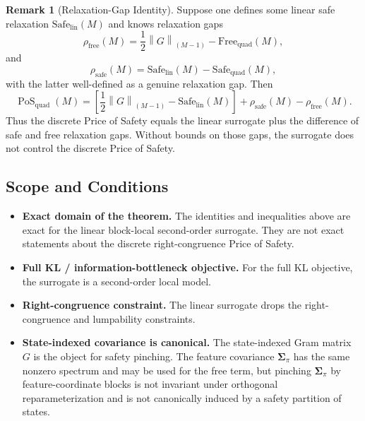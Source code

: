 \documentclass[12pt]{article}
\theoremstyle{definition}
\newtheorem{remark}[theorem]{Remark}
\DeclareMathOperator{\PoS}{PoS}
\newcommand{\KyF}[2]{\left\|#1\right\|_{(#2)}}
\newcommand{\PoSquad}{\PoS_{\mathrm{quad}}}
\begin{document}
\begin{remark}[Relaxation-Gap Identity]
\label{rem:relaxation-gap}
Suppose one defines some linear safe relaxation
$\mathrm{Safe}_{\mathrm{lin}}(M)$ and knows relaxation gaps
\[
\rho_{\mathrm{free}}(M)
=
\frac12
\KyF{G}{M-1}
-
\mathrm{Free}_{\mathrm{quad}}(M),
\]
and
\[
\rho_{\mathrm{safe}}(M)
=
\mathrm{Safe}_{\mathrm{lin}}(M)
-
\mathrm{Safe}_{\mathrm{quad}}(M),
\]
with the latter well-defined as a genuine relaxation gap.  Then
\[
\PoSquad(M)
=
\left[
\frac12
\KyF{G}{M-1}
-
\mathrm{Safe}_{\mathrm{lin}}(M)
\right]
+
\rho_{\mathrm{safe}}(M)
-
\rho_{\mathrm{free}}(M).
\]
Thus the discrete Price of Safety equals the linear surrogate plus the
difference of safe and free relaxation gaps.  Without bounds on those gaps, the
surrogate does not control the discrete Price of Safety.
\end{remark}

\subsection{Scope and Conditions}
\label{subsec:pos-scope}

\begin{itemize}[leftmargin=1.6em]
\item \textbf{Exact domain of the theorem.}
The identities and inequalities above are exact for the linear block-local
second-order surrogate.  They are not exact statements about the discrete
right-congruence Price of Safety.

\item \textbf{Full KL / information-bottleneck objective.}
For the full KL objective, the surrogate is a second-order local model.

\item \textbf{Right-congruence constraint.}
The linear surrogate drops the right-congruence and lumpability constraints.

\item \textbf{State-indexed covariance is canonical.}
The state-indexed Gram matrix $G$ is the object for safety pinching.  The
feature covariance $\bm{\Sigma}_\pi$ has the same nonzero spectrum and may be used
for the free term, but pinching $\bm{\Sigma}_\pi$ by feature-coordinate blocks is
not invariant under orthogonal reparameterization and is not canonically
induced by a safety partition of states.
\end{itemize}
\end{document}

